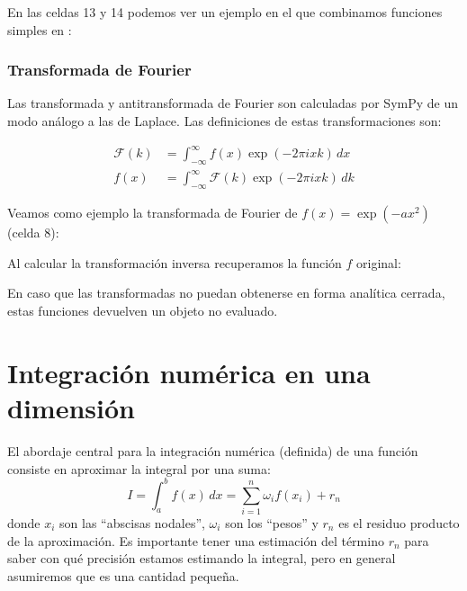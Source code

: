 En las celdas 13 y 14 podemos ver un ejemplo en el que combinamos funciones simples en :


\subsubsection{Transformada de Fourier}
Las transformada y antitransformada de Fourier son calculadas por SymPy de un modo análogo a las de Laplace. Las definiciones de estas transformaciones son:

\begin{align}\label{eq:intti04}
\mathcal{F}(k) &= \int_{-\infty}^{\infty} f(x) \exp(-2 \pi i x k) \, dx \\
f(x) &= \int_{-\infty}^{\infty} \mathcal{F}(k) \exp(-2 \pi i x k) \, dk 
\end{align} 

Veamos como ejemplo la transformada de Fourier de $f(x) = \exp(-a x^2)$ (celda 8):

Al calcular la transformación inversa recuperamos la función $f$ original:

En caso que las transformadas no puedan obtenerse en forma analítica cerrada, estas funciones devuelven un objeto no evaluado.



\section{Integración numérica en una dimensión}
El abordaje central para la integración numérica (definida) de una función consiste en aproximar la integral por una suma:
\begin{equation}\label{eq:int02}
 I = \int_a^b f(x) \, dx = \sum_{i=1}^{n} {\omega_i f(x_i)} + r_n
\end{equation} 
donde $x_i$ son las ``abscisas nodales'', $\omega_i$ son los ``pesos'' y $r_n$ es el residuo producto de la aproximación. Es importante tener una estimación del término $r_n$ para saber con qué precisión estamos estimando la integral, pero en general asumiremos que es una cantidad pequeña.


